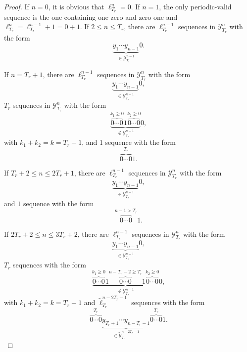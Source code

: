 \documentclass{article}
\begin{document}
      \begin{proof}
        If $n = 0$, it is obvious that $\ell_{T_r}^{n} = 0$. 
        If $n = 1$, the only periodic-valid sequence is the one containing one zero and zero one and $\ell_{T_r}^{n} = \ell_{T_r}^{n-1} + 1 = 0 + 1$.
        If $2 \leq n \leq T_r$, there are $\ell_{T_r}^{n-1}$ sequences in $\mathcal{Y}_{T_r}^{n}$ with the form
          \begin{equation*}
            \underbrace{y_{1} \cdots y_{n-1}}_{\in \mathcal{Y}_{T_r}^{n-1}} 0.
          \end{equation*} 
        
        If $n = T_r + 1$, there are $\ell_{T_r}^{n-1}$ sequences in $\mathcal{Y}_{T_r}^{n}$ with the form
          \begin{equation*}
            \underbrace{y_{1} \cdots y_{n-1}}_{\in \mathcal{Y}_{T_r}^{n-1}} 0,
          \end{equation*} 
        $T_r$ sequences in $\mathcal{Y}_{T_r}^{n}$ with the form
        \begin{equation*}
          \underbrace{\overbrace{0 \cdots 0}^{k_1 \geq 0} 1 \overbrace{0 \cdots 0}^{k_2 \geq 0}}_{\not \in \mathcal{Y}_{T_r}^{n-1}} 0,
        \end{equation*} 
        with $k_1 + k_2 = k = T_r - 1$, and 1 sequence with the form 
        \begin{equation*}
          \overbrace{0 \cdots 0}^{T_r} 1.
        \end{equation*} 

        If $T_r + 2 \leq n \leq 2T_r + 1$, there are $\ell_{T_r}^{n-1}$ sequences in $\mathcal{Y}_{T_r}^{n}$ with the form
        \begin{equation*}
          \underbrace{y_{1} \cdots y_{n-1}}_{\in \mathcal{Y}_{T_r}^{n-1}} 0,
        \end{equation*} 
        and $1$ sequence with the form
        \begin{equation*}
          \overbrace{0 \cdots 0}^{n - 1 > T_r} 1.
        \end{equation*} 
        
        
        If $2T_r + 2 \leq n \leq 3T_r + 2$, there are $\ell_{T_r}^{n-1}$ sequences in $\mathcal{Y}_{T_r}^{n}$ with the form
        \begin{equation*}
          \underbrace{y_{1} \cdots y_{n-1}}_{\in \mathcal{Y}_{T_r}^{n-1}} 0,
        \end{equation*} 
        $T_r$ sequences with the form
        \begin{equation*}
          \underbrace{\overbrace{0 \cdots 0}^{k_1 \geq 0} 1 \overbrace{0 \cdots 0}^{n-T_r-2 \geq T_r} 1 \overbrace{0 \cdots 0}^{k_2 \geq 0}}_{\not \in \mathcal{Y}_{T_r}^{n-1}} 0,
        \end{equation*} 
        with $k_1 + k_2 = k = T_r - 1$ and $\tilde{\ell}_{T_r}^{n-2T_r-1}$ sequences with the form
        \begin{equation*}
          \overbrace{0 \cdots 0}^{T_r} \underbrace{y_{T_r+1} \cdots y_{n-T_r-1}}_{\in \tilde{\mathcal{Y}}_{T_r}^{n-2T_r-1}} \overbrace{0 \cdots 0}^{T_r} 1.
        \end{equation*} 


\end{proof}
\end{document}

